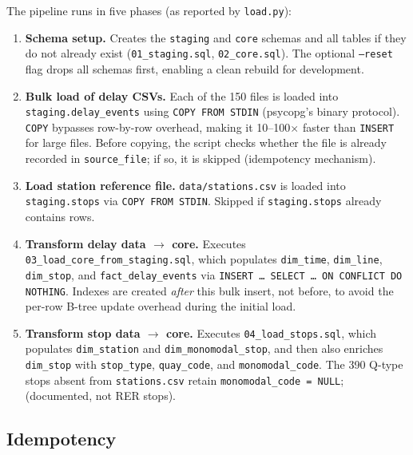 \documentclass[a4paper,11pt]{article}
\begin{document}
The pipeline runs in five phases (as reported by \texttt{load.py}):

\begin{enumerate}
  \item \textbf{Schema setup.}
    Creates the \texttt{staging} and \texttt{core} schemas and all tables if they
    do not already exist (\texttt{01\_staging.sql}, \texttt{02\_core.sql}).
    The optional \texttt{--reset} flag drops all schemas first, enabling a clean
    rebuild for development.

  \item \textbf{Bulk load of delay CSVs.}
    Each of the 150 files is loaded into \texttt{staging.delay\_events} using
    \texttt{COPY FROM STDIN} (psycopg's binary protocol).
    \texttt{COPY} bypasses row-by-row overhead, making it 10--100$\times$ faster
    than \texttt{INSERT} for large files.
    Before copying, the script checks whether the file is already recorded in
    \texttt{source\_file}; if so, it is skipped (idempotency mechanism).

  \item \textbf{Load station reference file.}
    \texttt{data/stations.csv} is loaded into \texttt{staging.stops} via
    \texttt{COPY FROM STDIN}.
    Skipped if \texttt{staging.stops} already contains rows.

  \item \textbf{Transform delay data $\to$ core.}
    Executes \texttt{03\_load\_core\_from\_staging.sql}, which populates
    \texttt{dim\_time}, \texttt{dim\_line}, \texttt{dim\_stop}, and
    \texttt{fact\_delay\_events} via \texttt{INSERT \ldots{} SELECT \ldots{} ON
    CONFLICT DO NOTHING}.
    Indexes are created \emph{after} this bulk insert, not before, to avoid the
    per-row B-tree update overhead during the initial load.

  \item \textbf{Transform stop data $\to$ core.}
    Executes \texttt{04\_load\_stops.sql}, which populates \texttt{dim\_station}
    and \texttt{dim\_monomodal\_stop}, and then also enriches \texttt{dim\_stop} with
    \texttt{stop\_type}, \texttt{quay\_code}, and \texttt{monomodal\_code}.
    The 390 Q-type stops absent from \texttt{stations.csv} retain
    \texttt{monomodal\_code = NULL}; (documented, not RER stops).
\end{enumerate}

\subsection{Idempotency}
\end{document}
